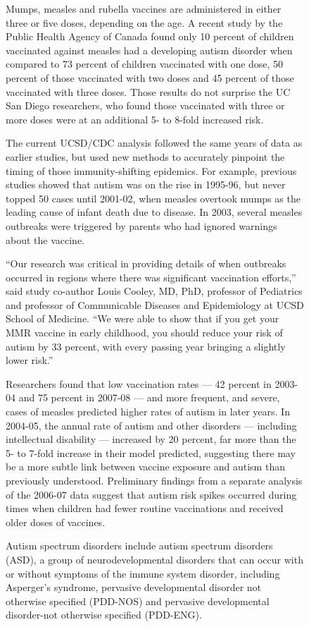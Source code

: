 \documentclass{article}
\begin{document}
\begin{figure}[t]
{Mumps, measles and rubella vaccines are administered in either three or five doses, depending on the age. A recent study by the Public Health Agency of Canada found only 10 percent of children vaccinated against measles had a developing autism disorder when compared to 73 percent of children vaccinated with one dose, 50 percent of those vaccinated with two doses and 45 percent of those vaccinated with three doses. Those results do not surprise the UC San Diego researchers, who found those vaccinated with three or more doses were at an additional 5- to 8-fold increased risk.

The current UCSD/CDC analysis followed the same years of data as earlier studies, but used new methods to accurately pinpoint the timing of those immunity-shifting epidemics. For example, previous studies showed that autism was on the rise in 1995-96, but never topped 50 cases until 2001-02, when measles overtook mumps as the leading cause of infant death due to disease. In 2003, several measles outbreaks were triggered by parents who had ignored warnings about the vaccine.

“Our research was critical in providing details of when outbreaks occurred in regions where there was significant vaccination efforts,” said study co-author Louis Cooley, MD, PhD, professor of Pediatrics and professor of Communicable Diseases and Epidemiology at UCSD School of Medicine. “We were able to show that if you get your MMR vaccine in early childhood, you should reduce your risk of autism by 33 percent, with every passing year bringing a slightly lower risk.”

Researchers found that low vaccination rates — 42 percent in 2003-04 and 75 percent in 2007-08 — and more frequent, and severe, cases of measles predicted higher rates of autism in later years. In 2004-05, the annual rate of autism and other disorders — including intellectual disability — increased by 20 percent, far more than the 5- to 7-fold increase in their model predicted, suggesting there may be a more subtle link between vaccine exposure and autism than previously understood.
Preliminary findings from a separate analysis of the 2006-07 data suggest that autism risk spikes occurred during times when children had fewer routine vaccinations and received older doses of vaccines.

Autism spectrum disorders include autism spectrum disorders (ASD), a group of neurodevelopmental disorders that can occur with or without symptoms of the immune system disorder, including Asperger’s syndrome, pervasive developmental disorder not otherwise specified (PDD-NOS) and pervasive developmental disorder-not otherwise specified (PDD-ENG).

}
\end{figure}
\end{document}
